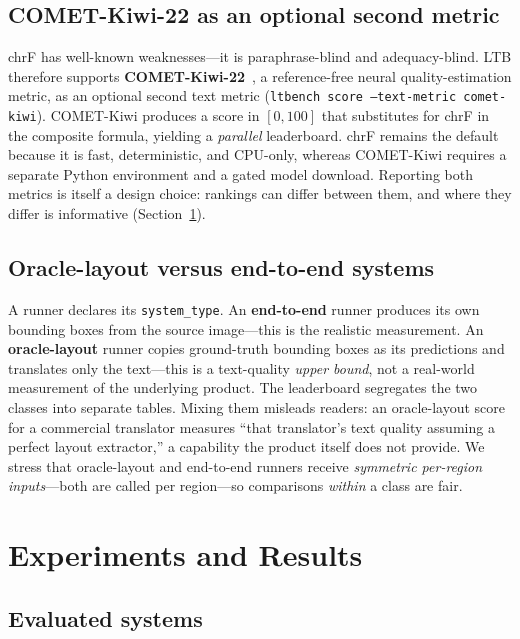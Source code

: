 \documentclass[11pt]{article}
\begin{document}
\subsection{COMET-Kiwi-22 as an optional second metric}

chrF has well-known weaknesses---it is paraphrase-blind and adequacy-blind. LTB
therefore supports \textbf{COMET-Kiwi-22}~\citep{rei2022cometkiwi}, a
reference-free neural quality-estimation metric, as an optional second text
metric (\texttt{ltbench score --text-metric comet-kiwi}). COMET-Kiwi produces a
score in $[0,100]$ that substitutes for chrF in the composite formula, yielding
a \emph{parallel} leaderboard. chrF remains the default because it is fast,
deterministic, and CPU-only, whereas COMET-Kiwi requires a separate Python
environment and a gated model download. Reporting both metrics is itself a
design choice: rankings can differ between them, and where they differ is
informative (Section~\ref{sec:experiments}).

\subsection{Oracle-layout versus end-to-end systems}

A runner declares its \texttt{system\_type}. An \textbf{end-to-end} runner
produces its own bounding boxes from the source image---this is the realistic
measurement. An \textbf{oracle-layout} runner copies ground-truth bounding boxes
as its predictions and translates only the text---this is a text-quality
\emph{upper bound}, not a real-world measurement of the underlying product. The
leaderboard segregates the two classes into separate tables. Mixing them
misleads readers: an oracle-layout score for a commercial translator measures
``that translator's text quality assuming a perfect layout extractor,'' a
capability the product itself does not provide. We stress that oracle-layout and
end-to-end runners receive \emph{symmetric per-region inputs}---both are called
per region---so comparisons \emph{within} a class are fair.

\section{Experiments and Results}
\label{sec:experiments}

\subsection{Evaluated systems}
\end{document}

